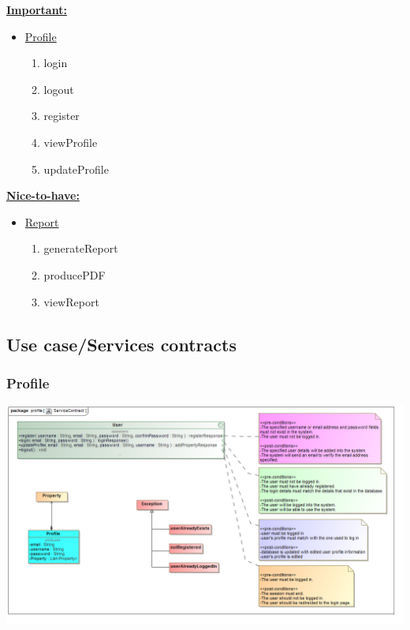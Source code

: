 \documentclass[a4paper,12pt]{article}
\begin{document}
\underline{\textbf{Important:}}
	\begin{itemize}
		\item \underline{Profile}
			\begin{enumerate}
				\item login
				\item logout
				\item register
				\item viewProfile
				\item updateProfile
			\end {enumerate}

	\end{itemize}

\underline{\textbf{Nice-to-have:}}
	\begin{itemize}
		\item \underline{Report}
			\begin{enumerate}
				\item generateReport
				\item producePDF
				\item viewReport
			\end{enumerate}
	\end{itemize}

\subsection{Use case/Services contracts}
\subsubsection{Profile}
	\includegraphics[width=1\textwidth]{./Images/newDiagrams/serviceContract/ServiceContract.png}

\end{document}
